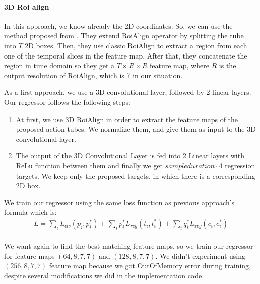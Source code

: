 \paragraph{3D Roi align}
In this approach, we know already the 2D coordinates. So, we can use the method proposed from \cite{DBLP:journals/corr/abs-1712-09184}. They
extend RoiAlign operator by splitting the tube into $T$ 2D boxes. Then, they use classic RoiAlign to extract a region from each one 
of the temporal slices in the feature map. After that, they concatenate the region in time domain so they get a $T \times R \times R$
feature map, where $R$ is the output resolution of RoiAlign, which is 7 in our situation. \par

As a first approach, we use a 3D convolutional layer, followed by 2 linear layers. Our regressor follows the following steps:
\begin{enumerate}
\item At first, we use 3D RoiAlign in order to extract the feature maps of the proposed action tubes. We normalize them, and give them as input to the 3D
  convolutional layer.
\item The output of the 3D Convolutional Layer is fed into 2 Linear layers with ReLu function between them and finally we get $sample duration \cdot 4$
  regression targets. We keep only the proposed targets, in which there is a corresponding 2D box.
\end{enumerate}


We train our regressor using the same loss function as previous approach's formula which is:
\begin{equation*} 
\begin{split}
 L  =  \sum_iL_{cls}(p_i, p_i^*) +
 \sum_ip_i^*L_{reg}(t_i,t_i^*) +  
  \sum_iq_i^*L_{reg}(c_{i}, c_{i}^*)  \\
\end{split}
\end{equation*}

We want again to find the best matching feature maps, so we train our regressor for feature maps
$(64,8,7,7)$ and $(128,8,7,7)$. We didn't experiment using $(256,8,7,7)$ feature map because
we got OutOfMemory error during training, despite several modifications we did in the
implementation code.

